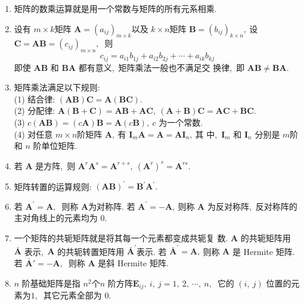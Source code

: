 \begin{enumerate}
		\item  矩阵的数乘运算就是用一个常数与矩阵的所有元系相乘.
		\item 设有 $ m \times k  $矩阵  $\boldsymbol{A}=\left(a_{i j}\right)_{m \times k}  $以及 $ k \times n  $矩阵 $ \boldsymbol{B}=\left(b_{i j}\right)_{k \times n} ,\  $设  $\boldsymbol{C}=\boldsymbol{A} \boldsymbol{B}=\left(c_{i j}\right)_{m \times n} ,\ $ 则
		$$c_{i j}=a_{i 1} b_{1 j}+a_{i 2} b_{2 j}+\cdots+a_{i k} b_{k j}$$
		即使 $ \boldsymbol{A B} $ 和 $ \boldsymbol{B A} $ 都有意义,\  矩阵乘法一般也不满足交 换律,\  即  $\boldsymbol{A} \boldsymbol{B} \neq \boldsymbol{BA} .$
		\item 矩阵乘法满足以下规则:\\
		(1) 结合律: $ (\boldsymbol{A B}) \boldsymbol{C}=\boldsymbol{A}(\boldsymbol{BC}) .$\\
		(2) 分配律: $ \boldsymbol{A}(\boldsymbol{B}+\boldsymbol{C})=\boldsymbol{AB}+\boldsymbol{AC},\ (\boldsymbol{A}+\boldsymbol{B}) \boldsymbol{C}= \boldsymbol{AC}+\boldsymbol{BC} .$\\
		(3)  $c(\boldsymbol{A} \boldsymbol{B})=(c \boldsymbol{A}) \boldsymbol{B}=\boldsymbol{A}(c \boldsymbol{B}),\  c$  为一个常数.\\
		(4) 对任意 $ m \times n  $阶矩阵  $\boldsymbol{A} ,\  $有  $\boldsymbol{I}_{m} \boldsymbol{A}=\boldsymbol{A}=\boldsymbol{A} \boldsymbol{I}_{n} ,\  $其 中,\   $\boldsymbol{I}_{m}$  和  $\boldsymbol{I}_{n}$  分别是 $ m  $阶和 $ n$  阶单位矩阵.
		\item 若  $\boldsymbol{A}$  是方阵,\  则  $\boldsymbol{A}^{r} \boldsymbol{A}^{s}=\boldsymbol{A}^{r+s},\ \left(\boldsymbol{A}^{r}\right)^{s}=\boldsymbol{A}^{r s} .$
		\item 矩阵转置的运算规则: $ (\boldsymbol{A} \boldsymbol{B})^{\prime}=\boldsymbol{B}^{\prime} \boldsymbol{A}^{\prime} .$
		\item 若 $ \boldsymbol{A}^{\prime}=\boldsymbol{A} ,\ $ 则称  $\boldsymbol{A}  $为对称阵. 若  $\boldsymbol{A}^{\prime}=-\boldsymbol{A} ,\  $则称 $ \boldsymbol{A} $ 为反对称阵,\  反对称阵的主对角线上的元素均为 $0 .$
		\item 一个矩阵的共轭矩阵就是将其每一个元素都变成共轭复 数. $ \boldsymbol{A} $ 的共轭矩阵用 $ \bar{\boldsymbol{A}} $ 表示,\   $\boldsymbol{A} $ 的共轭转置矩阵用  $\bar{\boldsymbol{A}}^{\prime}  $表示. 若  $\bar{\boldsymbol{A}}^{\prime}=\boldsymbol{A} ,\  $则称  $\boldsymbol{A} $ 是 Hermite 矩阵. 若 $ \bar{\boldsymbol{A}}'=-\boldsymbol{A} ,\ $ 则称 $ \boldsymbol{A} $ 是斜 Hermite 矩阵.
		\item  $n $ 阶基础矩阵是指  $n^{2}  $个$  n $ 阶方阵$  \boldsymbol{E}_{i j},\  i,\  j=1,\ 2,\  \cdots,\  n ,\ $ 它的 $ (i,\  j) $ 位置的元素为$ 1 ,\ $ 其它元素全部为 $0 .$

\end{enumerate}
